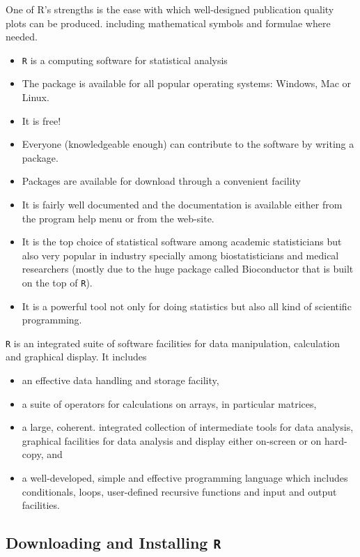 \documentclass[12pt, a4paper]{article}
\begin{document}
\newpage
\noindent One of R's strengths is the ease with which well-designed publication quality plots can be produced.
including mathematical symbols and formulae where needed.
\begin{itemize} \item
	\texttt{R} is a computing software for statistical analysis \item The package is available for all popular operating systems: Windows, Mac or Linux.
	\item It is free!
	\item Everyone (knowledgeable enough) can contribute to the software by
	writing a package.
	\item Packages are available for download through a convenient facility
	\item It is fairly well documented and the documentation is available either
	from the program help menu or from the web-site.
	\item It is the top choice of statistical software among academic statisticians
	but also very popular in industry specially among biostatisticians and
	medical researchers (mostly due to the huge package called
	Bioconductor that is built on the top of \texttt{R}).
	\item It is a powerful tool not only for doing statistics but also all kind of
	scientific programming.
\end{itemize}
\newpage

\noindent \texttt{R} is an integrated suite of software facilities for data manipulation, calculation and graphical display. It
includes
\begin{itemize}
	\item an effective data handling and storage facility,
	\item a suite of operators for calculations on arrays, in particular matrices,
	\item a large, coherent. integrated collection of intermediate tools for data analysis,
	graphical facilities for data analysis and display either on-screen or on hard-copy, and
	\item a well-developed, simple and effective programming language which includes conditionals, loops,
	user-defined recursive functions and input and output facilities.
\end{itemize}

\subsection{Downloading and Installing \texttt{R}}
\end{document}
